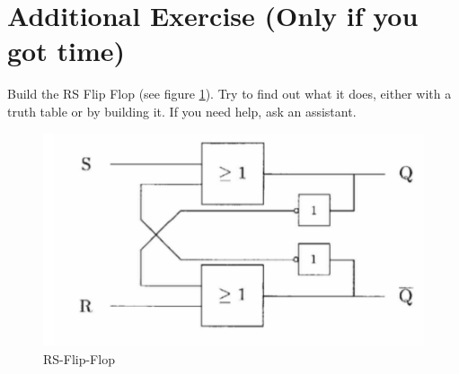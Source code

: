 \documentclass[10pt,a4paper]{article}
\begin{document}
\section{Additional Exercise (Only if you got time)}
Build the RS Flip Flop (see figure \ref{fig:RSFF}). Try to find out what it does, either with a truth table or by building it. If you need help, ask an assistant.

\begin{figure}[H]
	\centering
	\includegraphics[height=0.35\textwidth]{RSFF}%
	\caption{RS-Flip-Flop}%
	\label{fig:RSFF}
\end{figure}

\newpage
\end{document}
